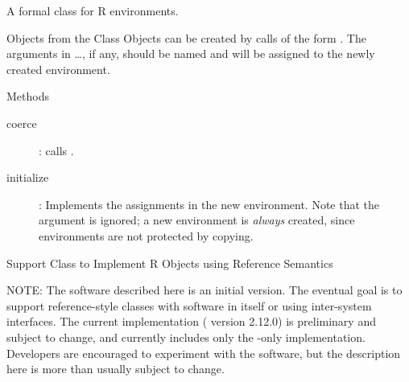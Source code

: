 %
\begin{Description}\relax
 A formal class for R environments.
\end{Description}
%
\begin{Section}{Objects from the Class}
Objects can be created by calls of the form .
The arguments in \dots, if any, should be named and will be assigned to
the newly created environment.
\end{Section}
%
\begin{Section}{Methods}
\begin{description}

\item[coerce] :
calls . 
\item[initialize] :
Implements the assignments in the new environment.  Note that the
 argument is ignored; a new environment is
\emph{always} created, since environments are not protected by copying. 

\end{description}

\end{Section}
%
\begin{SeeAlso}\relax
\end{SeeAlso}
%
\begin{Description}\relax
Support Class to Implement R Objects using Reference Semantics
\end{Description}
%
\begin{Section}{NOTE:}
The software described here is an initial version.  The eventual goal
is to support reference-style classes with software in \R{} itself
or using inter-system interfaces.  The current implementation (\R{}
version 2.12.0) is preliminary and subject to change, and currently
includes only the \R{}-only implementation.  Developers are encouraged
to experiment with the software, but the description here is more than
usually subject to change.
\end{Section}
